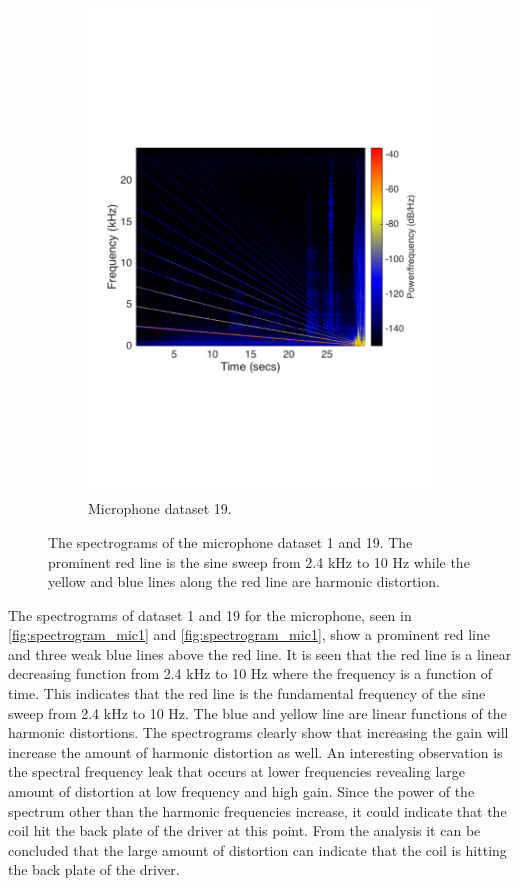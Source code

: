 \begin{figure}[H]
\begin{subfigure}[t]{0.47\textwidth}
	\includegraphics[width=1\textwidth]{figures/spectrogram_mic19.pdf}
	\caption{Microphone dataset 19.}
	\label{fig:spectrogram_mic19}
\end{subfigure}
\caption{The spectrograms of the microphone dataset 1 and 19. The prominent red line is the sine sweep from 2.4 kHz to 10 Hz while the yellow and blue lines along the red line are harmonic distortion.}
\label{fig:spec_mic}
\end{figure} 

The spectrograms of dataset 1 and 19 for the microphone, seen in \autoref{fig:spectrogram_mic1} and \autoref{fig:spectrogram_mic1}, show a prominent red line and three weak blue lines above the red line. It is seen that the red line is a linear decreasing function from 2.4 kHz to 10 Hz where the frequency is a function of time. This indicates that the red line is the fundamental frequency of the sine sweep from 2.4 kHz to 10 Hz. The blue and yellow line are linear functions of the harmonic distortions. The spectrograms clearly show that increasing the gain will increase the amount of harmonic distortion as well. An interesting observation is the spectral frequency leak that occurs at lower frequencies revealing large amount of distortion at low frequency and high gain. Since the power of the spectrum other than the harmonic frequencies increase, it could indicate that the coil hit the back plate of the driver at this point. From the analysis it can be concluded that the large amount of distortion can indicate that the coil is hitting the back plate of the driver.

